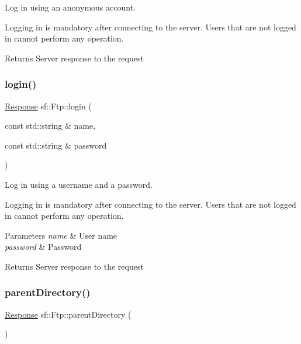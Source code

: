 Log in using an anonymous account. 

Logging in is mandatory after connecting to the server. Users that are not logged in cannot perform any operation.

\begin{DoxyReturn}{Returns}
Server response to the request \begin{DoxyVerb}\end{DoxyVerb}
 
\end{DoxyReturn}
\mbox{\label{classsf_1_1_ftp_a99d8114793c1659e9d51d45cecdcd965}} 
\subsubsection{\texorpdfstring{login()}{login()}\hspace{0.1cm}{\footnotesize\ttfamily [2/2]}}
{\footnotesize\ttfamily \mbox{\hyperlink{classsf_1_1_ftp_1_1_response}{Response}} sf\+::\+Ftp\+::login (\begin{DoxyParamCaption}\item[{const std\+::string \&}]{name,  }\item[{const std\+::string \&}]{password }\end{DoxyParamCaption})}



Log in using a username and a password. 

Logging in is mandatory after connecting to the server. Users that are not logged in cannot perform any operation.


\begin{DoxyParams}{Parameters}
{\em name} & User name \\
\hline
{\em password} & Password\\
\hline
\end{DoxyParams}
\begin{DoxyReturn}{Returns}
Server response to the request \begin{DoxyVerb}\end{DoxyVerb}
 
\end{DoxyReturn}
\mbox{\label{classsf_1_1_ftp_ad295cf77f30f9ad07b5c401fd9849189}} 
\subsubsection{\texorpdfstring{parentDirectory()}{parentDirectory()}}
{\footnotesize\ttfamily \mbox{\hyperlink{classsf_1_1_ftp_1_1_response}{Response}} sf\+::\+Ftp\+::parent\+Directory (\begin{DoxyParamCaption}{ }\end{DoxyParamCaption})}



